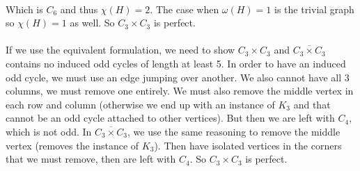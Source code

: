 \documentclass[letterpaper, 11pt]{article}
\newcommand{\1}{\mathds{1}}	%
\theoremstyle{definition}
\begin{document}
\begin{center}
\end{center}
~\\Which is $C_6$ and thus $\chi (H) = 2$. The case when $\omega (H) = 1$ is the trivial graph so $\chi (H) = 1$ as well. So $C_3 \times C_3$ is perfect. ~\\~\\If we use the equivalent formulation, we need to show $C_3 \times C_3$ and $\overline{C_3 \times C_3}$ contains no induced odd cycles of length at least 5. In order to have an induced odd cycle, we must use an edge jumping over another. We also cannot have all 3 columns, we must remove one entirely. We must also remove the middle vertex in each row and column (otherwise we end up with an instance of $K_3$ and that cannot be an odd cycle attached to other vertices). But then we are left with $C_4$, which is not odd. In $\overline{C_3 \times C_3}$, we use the same reasoning to remove the middle vertex (removes the instance of $K_3$). Then have isolated vertices in the corners that we must remove, then are left with $C_4$. So $C_3 \times C_3$ is perfect.
\end{document}
